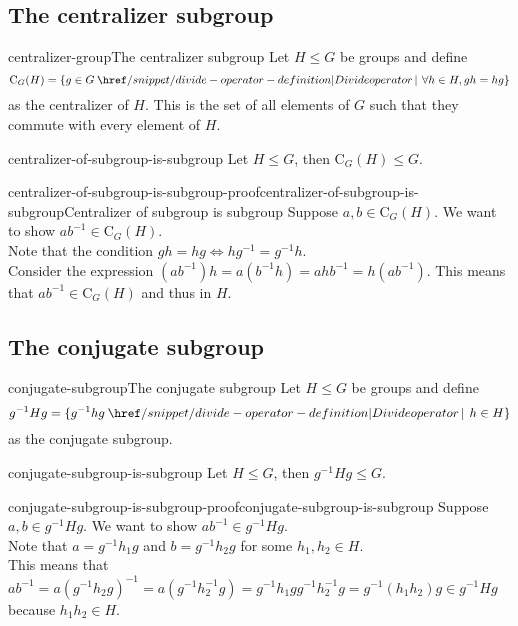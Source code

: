 \documentclass[preview]{standalone}
\begin{document}
\subsection{The centralizer subgroup}

\begin{snippetdefinition}{centralizer-group}{The centralizer subgroup}
    Let \(H \leq G\) be groups and define
    \[
        \text{C}_G(H) = \{
            g \in G \divides \forall h \in H, gh=hg
        \}
    \]
    as the centralizer of \(H\).
    This is the set of all elements of \(G\) such that they commute with every element of \(H\).
\end{snippetdefinition}

\begin{snippettheorem}{centralizer-of-subgroup-is-subgroup}{}
    Let \(H \leq G\), then \(\text{C}_G(H) \leq G\).
\end{snippettheorem}

\begin{snippetproof}{centralizer-of-subgroup-is-subgroup-proof}{centralizer-of-subgroup-is-subgroup}{Centralizer of subgroup is subgroup}
    Suppose \(a,b \in \text{C}_G(H)\).
    We want to show \(ab^{-1} \in \text{C}_G(H)\).\\
    Note that the condition \(gh=hg \iff hg^{-1}=g^{-1}h\).\\
    Consider the expression \((ab^{-1})h = a(b^{-1}h) = ahb^{-1} = h(ab^{-1})\).
    This means that \(ab^{-1} \in \text{C}_G(H)\) and thus in \(H\).
\end{snippetproof}

\subsection{The conjugate subgroup}

\begin{snippetdefinition}{conjugate-subgroup}{The conjugate subgroup}
    Let \(H \leq G\) be groups and define
    \[
        g^{-1}Hg = \{
            g^{-1}hg \divides h \in H    
        \}
    \]
    as the conjugate subgroup.
\end{snippetdefinition}

\begin{snippettheorem}{conjugate-subgroup-is-subgroup}{}
    Let \(H \leq G\), then \(g^{-1}Hg \leq G\).
\end{snippettheorem}

\begin{snippetproof}{conjugate-subgroup-is-subgroup-proof}{conjugate-subgroup-is-subgroup}{}
    Suppose \(a,b \in g^{-1}Hg\).
    We want to show \(ab^{-1} \in g^{-1}Hg\).\\
    Note that \(a = g^{-1}h_1g\) and \(b = g^{-1}h_2g\)
    for some \(h_1, h_2 \in H\). \\
    This means that \(ab^{-1}=a{(g^{-1}h_2g)}^{-1} = a(g^{-1}h_2^{-1}g)
    =g^{-1}h_1gg^{-1}h_2^{-1}g = g^{-1} (h_1h_2) g \in g^{-1}Hg \)
    because \(h_1h_2 \in H\).
\end{snippetproof}
\end{document}
